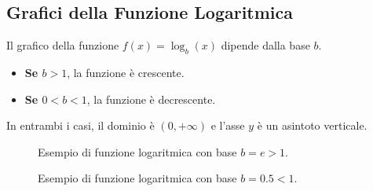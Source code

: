 \subsection{Grafici della Funzione Logaritmica}
Il grafico della funzione $f(x) = \log_b(x)$ dipende dalla base $b$.
\begin{itemize}
    \item \textbf{Se $b > 1$}, la funzione è crescente.
    \item \textbf{Se $0 < b < 1$}, la funzione è decrescente.
\end{itemize}
In entrambi i casi, il dominio è $(0, +\infty)$ e l'asse $y$ è un asintoto verticale.

\begin{figure}[!htbp]
\centering
{}
\caption{Esempio di funzione logaritmica con base $b=e > 1$.}
\end{figure}

\begin{figure}[!htbp]
\centering
{}
\caption{Esempio di funzione logaritmica con base $b=0.5 < 1$.}
\end{figure}